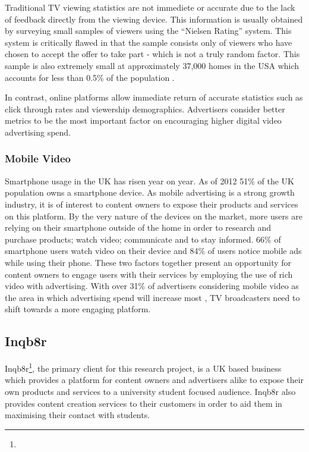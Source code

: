 	Traditional TV viewing statistics are not immediete or accurate due to the lack of feedback directly from the viewing device. This information is usually obtained by surveying small samples of viewers using the ``Nielsen Rating'' system. This system is critically flawed in that the sample consists only of viewers who have chosen to accept the offer to take part - which is not a truly random factor. This sample is also extremely small at approximately 37,000 homes in the USA which accounts for less than 0.5\% of the population \citep{nielsen-sample}.

	In contrast, online platforms allow immediate return of accurate statistics such as click through rates and viewership demographics. Advertisers consider better metrics to be the most important factor on encouraging higher digital video advertising spend.

	\subsubsection{Mobile Video}

	Smartphone usage in the UK has risen year on year. As of 2012 51\% of the UK population owns a smartphone device. As mobile advertising is a strong growth industry, it is of interest to content owners to expose their products and services on this platform. By the very nature of the devices on the market, more users are relying on their smartphone outside of the home in order to research and purchase products; watch video; communicate and to stay informed. 66\% of smartphone users watch video on their device and 84\% of users notice mobile ads while using their phone. \citep{mobile-planet} These two factors together present an opportunity for content owners to engage users with their services by employing the use of rich video with advertising. With over 31\% of advertisers considering mobile video as the area in which advertising spend will increase most \citep{brightroll-report}, TV broadcasters need to shift towards a more engaging platform.


	\subsection{Inqb8r}

	Inqb8r\footnote{}, the primary client for this research project, is a UK based business which provides a platform for content owners and advertisers alike to expose their own products and services to a university student focused audience. Inqb8r also provides content creation services to their customers in order to aid them in maximising their contact with students.

